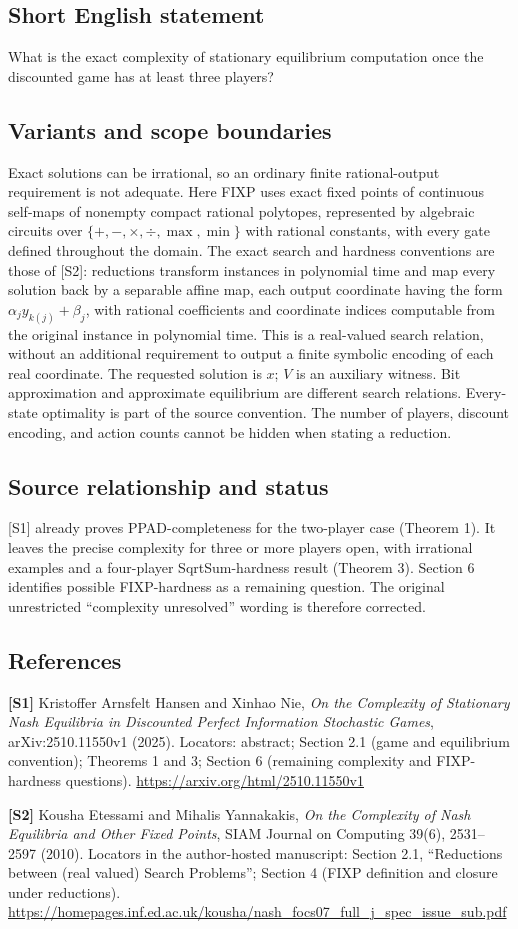 \documentclass[11pt,a4paper]{article}
\begin{document}
\subsection*{Short English statement}
What is the exact complexity of stationary equilibrium computation once the discounted game has at least three players?
\subsection*{Variants and scope boundaries}
Exact solutions can be irrational, so an ordinary finite rational-output requirement is not adequate. Here FIXP uses exact fixed points of continuous self-maps of nonempty compact rational polytopes, represented by algebraic circuits over $\{+,-,\times,\div,\max,\min\}$ with rational constants, with every gate defined throughout the domain. The exact search and hardness conventions are those of [S2]: reductions transform instances in polynomial time and map every solution back by a separable affine map, each output coordinate having the form $\alpha_j y_{k(j)}+\beta_j$, with rational coefficients and coordinate indices computable from the original instance in polynomial time. This is a real-valued search relation, without an additional requirement to output a finite symbolic encoding of each real coordinate. The requested solution is $x$; $V$ is an auxiliary witness. Bit approximation and approximate equilibrium are different search relations. Every-state optimality is part of the source convention. The number of players, discount encoding, and action counts cannot be hidden when stating a reduction.
\subsection*{Source relationship and status}
[S1] already proves PPAD-completeness for the two-player case (Theorem 1). It leaves the precise complexity for three or more players open, with irrational examples and a four-player SqrtSum-hardness result (Theorem 3). Section 6 identifies possible FIXP-hardness as a remaining question. The original unrestricted ``complexity unresolved'' wording is therefore corrected.
\subsection*{References}
\begingroup\footnotesize\raggedright
\textbf{[S1]} Kristoffer Arnsfelt Hansen and Xinhao Nie, \emph{On the Complexity of Stationary Nash Equilibria in Discounted Perfect Information Stochastic Games}, arXiv:2510.11550v1 (2025). Locators: abstract; Section 2.1 (game and equilibrium convention); Theorems 1 and 3; Section 6 (remaining complexity and FIXP-hardness questions). \url{https://arxiv.org/html/2510.11550v1}
\par
\textbf{[S2]} Kousha Etessami and Mihalis Yannakakis, \emph{On the Complexity of Nash Equilibria and Other Fixed Points}, SIAM Journal on Computing 39(6), 2531--2597 (2010). Locators in the author-hosted manuscript: Section 2.1, ``Reductions between (real valued) Search Problems''; Section 4 (FIXP definition and closure under reductions). \url{https://homepages.inf.ed.ac.uk/kousha/nash_focs07_full_j_spec_issue_sub.pdf}
\par\endgroup
\end{document}
